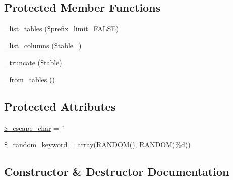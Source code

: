 \subsection*{Protected Member Functions}
\begin{DoxyCompactItemize}
\item 
\mbox{\hyperlink{class_c_i___d_b__pdo__cubrid__driver_a435c0f3ce54fe7daa178baa8532ebd54}{\+\_\+list\+\_\+tables}} (\$prefix\+\_\+limit=F\+A\+L\+SE)
\item 
\mbox{\hyperlink{class_c_i___d_b__pdo__cubrid__driver_a7ccb7f9c301fe7f0a9db701254142b63}{\+\_\+list\+\_\+columns}} (\$table=\textquotesingle{}\textquotesingle{})
\item 
\mbox{\hyperlink{class_c_i___d_b__pdo__cubrid__driver_aa029600528fc1ce660a23ff4b4667f95}{\+\_\+truncate}} (\$table)
\item 
\mbox{\hyperlink{class_c_i___d_b__pdo__cubrid__driver_aef43f7e3e7b71d337ff3724c5eb14f10}{\+\_\+from\+\_\+tables}} ()
\end{DoxyCompactItemize}
\subsection*{Protected Attributes}
\begin{DoxyCompactItemize}
\item 
\mbox{\hyperlink{class_c_i___d_b__pdo__cubrid__driver_aaec2fb0112850159063a8e47ad3aed6e}{\$\+\_\+escape\+\_\+char}} = \textquotesingle{}\`{}\textquotesingle{}
\item 
\mbox{\hyperlink{class_c_i___d_b__pdo__cubrid__driver_a10213aa6e05f6d924d3277bb1d2fea00}{\$\+\_\+random\+\_\+keyword}} = array(\textquotesingle{}R\+A\+N\+D\+OM()\textquotesingle{}, \textquotesingle{}R\+A\+N\+D\+OM(\%d)\textquotesingle{})
\end{DoxyCompactItemize}


\subsection{Constructor \& Destructor Documentation}
\mbox{\label{class_c_i___d_b__pdo__cubrid__driver_a9162320adff1a1a4afd7f2372f753a3e}} 
